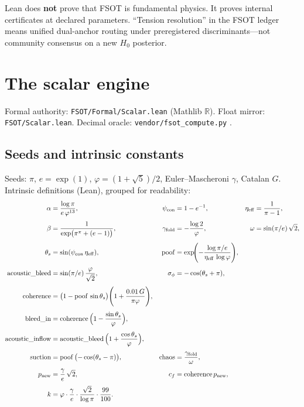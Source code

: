 \documentclass[11pt,a4paper]{article}
\begin{document}
\noindent
Lean does \textbf{not} prove that FSOT is fundamental physics.
It proves internal certificates at declared parameters.
``Tension resolution'' in the FSOT ledger means unified dual-anchor routing
under preregistered discriminants---not community consensus on a new $H_0$
posterior.

\section{The scalar engine}
\label{sec:scalar}

Formal authority: \texttt{FSOT/Formal/Scalar.lean} (Mathlib $\mathbb{R}$).
Float mirror: \texttt{FSOT/Scalar.lean}.
Decimal oracle: \texttt{vendor/fsot\_compute.py} \cite{FSOT21Lean}.

\subsection{Seeds and intrinsic constants}

Seeds: $\pi$, $e=\exp(1)$, $\varphi=(1+\sqrt{5})/2$, Euler--Mascheroni $\gamma$,
Catalan $G$.
Intrinsic definitions (Lean), grouped for readability:
\begin{align}
\alpha &= \frac{\log\pi}{e\,\varphi^{13}},
&
\psi_{\mathrm{con}} &= 1-e^{-1},
&
\eta_{\mathrm{eff}} &= \frac{1}{\pi-1},
\label{eq:seeds-core}\\[0.35em]
\beta &= \frac{1}{\exp\bigl(\pi^{\pi}+(e-1)\bigr)},
&
\gamma_{\mathrm{fold}} &= -\frac{\log 2}{\varphi},
&
\omega &= \sin(\pi/e)\,\sqrt{2},
\label{eq:seeds-beta}\\[0.35em]
\theta_s &= \sin(\psi_{\mathrm{con}}\,\eta_{\mathrm{eff}}),
&
\mathrm{poof}
  &= \exp\!\Biggl(
       -\frac{\log\pi/e}{\eta_{\mathrm{eff}}\,\log\varphi}
     \Biggr),
\label{eq:seeds-poof}\\[0.35em]
\mathrm{acoustic\_bleed}
  &= \sin(\pi/e)\,\frac{\varphi}{\sqrt{2}},
&
\sigma_\phi &= -\cos(\theta_s+\pi),
\label{eq:seeds-acoustic}\\[0.35em]
\mathrm{coherence}
  &= \bigl(1-\mathrm{poof}\,\sin\theta_s\bigr)
     \Biggl(1+\frac{0.01\,G}{\pi\varphi}\Biggr),
\label{eq:seeds-coh}\\[0.35em]
\mathrm{bleed\_in}
  &= \mathrm{coherence}\,\Bigl(1-\frac{\sin\theta_s}{\varphi}\Bigr),
\label{eq:seeds-bleed}\\[0.35em]
\mathrm{acoustic\_inflow}
  &= \mathrm{acoustic\_bleed}\,
     \Bigl(1+\frac{\cos\theta_s}{\varphi}\Bigr),
\label{eq:seeds-inflow}\\[0.35em]
\mathrm{suction}
  &= \mathrm{poof}\,\bigl(-\cos(\theta_s-\pi)\bigr),
&
\mathrm{chaos}
  &= \frac{\gamma_{\mathrm{fold}}}{\omega},
\label{eq:seeds-chaos}\\[0.35em]
p_{\mathrm{new}} &= \frac{\gamma}{e}\,\sqrt{2},
&
c_f &= \mathrm{coherence}\,p_{\mathrm{new}},
\label{eq:seeds-cf}\\[0.35em]
k
  &= \varphi\cdot\frac{\gamma}{e}\cdot\frac{\sqrt{2}}{\log\pi}
     \cdot\frac{99}{100}.
\label{eq:k}
\end{align}
\end{document}
